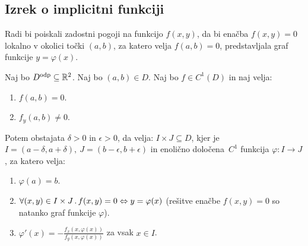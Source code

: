 \subsection{Izrek o implicitni funkciji}
Radi bi poiskali zadostni pogoji na funkcijo $f(x, y)$, da bi enačba $f(x, y) = 0$ lokalno v okolici točki $(a,b)$, za katero velja $f(a,b) = 0$, predstavljala graf funkcije $y = \varphi(x)$.

\begin{izrek}
    Naj bo $D^{\text{odp}} \subseteq \mathbb{R}^2$. Naj bo $(a, b) \in D$. Naj bo $f \in C^1(D)$ in naj velja:
    \begin{enumerate}
        \item $f(a,b) = 0$.
        \item $f_y(a,b) \neq 0$.
    \end{enumerate}
    Potem obstajata $\delta > 0$ in $\epsilon > 0$, da velja: $I \times J \subseteq D$, kjer je $I = (a - \delta, a + \delta), \ J = (b-\epsilon, b+\epsilon)$ in enolično določena~$C^1$ funkcija $\varphi: I \to J$, za katero velja:
    \begin{enumerate}
        \item $\varphi(a) = b$.
        \item $\forall (x,y) \in I \times J \,.\, f(x, y) = 0 \Leftrightarrow y = \varphi (x)$ (rešitve enačbe $f(x,y) = 0$ so natanko graf funkcije $\varphi$).
        \item $\varphi'(x) = -\frac{f_x(x, \varphi(x))}{f_y(x, \varphi(x))}$ za vsak $x \in I$.
    \end{enumerate}
\end{izrek}